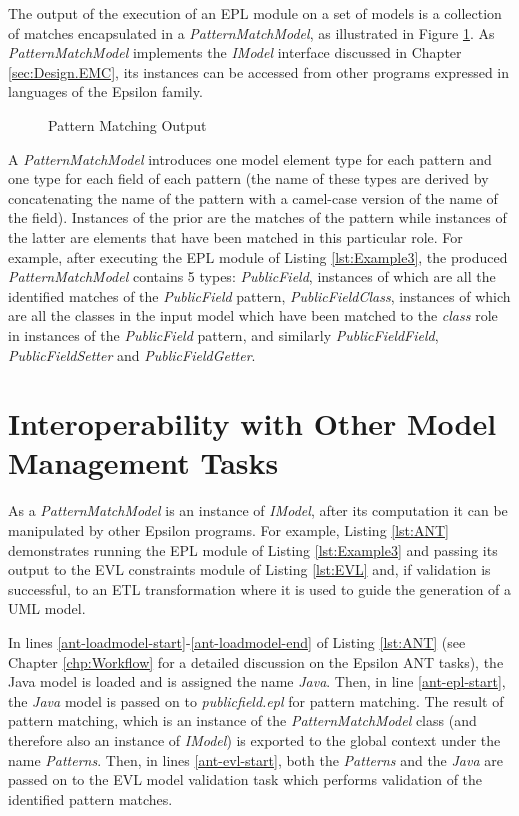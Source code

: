 The output of the execution of an EPL module on a set of models is a collection of matches encapsulated in a \emph{PatternMatchModel}, as illustrated in Figure \ref{fig:PatternMatchModel}. As \emph{PatternMatchModel} implements the \emph{IModel} interface discussed in Chapter \ref{sec:Design.EMC}, its instances can be accessed from other programs expressed in languages of the Epsilon family.

\begin{figure}[htbp]
\begin{center}
\caption{Pattern Matching Output}
\label{fig:PatternMatchModel}
\end{center}
\end{figure}

A \emph{PatternMatchModel} introduces one model element type for each pattern and one type for each field of each pattern (the name of these types are derived by concatenating the name of the pattern with a camel-case version of the name of the field). Instances of the prior are the matches of the pattern while instances of the latter are elements that have been matched in this particular role. For example, after executing the EPL module of Listing \ref{lst:Example3}, the produced \emph{PatternMatchModel} contains 5 types: \emph{PublicField}, instances of which are all the identified matches of the \emph{PublicField} pattern, \emph{PublicFieldClass}, instances of which are all the classes in the input model which have been matched to the \emph{class} role in instances of the \emph{PublicField} pattern, and similarly \emph{PublicFieldField}, \emph{PublicFieldSetter} and \emph{PublicFieldGetter}. 

\section{Interoperability with Other Model Management Tasks}

As a \emph{PatternMatchModel} is an instance of \emph{IModel}, after its computation it can be manipulated by other Epsilon programs. For example, Listing \ref{lst:ANT} demonstrates running the EPL module of Listing \ref{lst:Example3} and passing its output to the EVL constraints module of Listing \ref{lst:EVL} and, if validation is successful, to an ETL transformation where it is used to guide the generation of a UML model.

In lines \ref{ant-loadmodel-start}-\ref{ant-loadmodel-end} of Listing \ref{lst:ANT} (see Chapter \ref{chp:Workflow} for a detailed discussion on the Epsilon ANT tasks), the Java model is loaded and is assigned the name \emph{Java}. Then, in line \ref{ant-epl-start}, the \emph{Java} model is passed on to \emph{publicfield.epl} for pattern matching. The result of pattern matching, which is an instance of the \emph{PatternMatchModel} class (and therefore also an instance of \emph{IModel}) is exported to the global context under the name \emph{Patterns}. Then, in lines \ref{ant-evl-start}, both the \emph{Patterns} and the \emph{Java} are passed on to the EVL model validation task which performs validation of the identified pattern matches.

